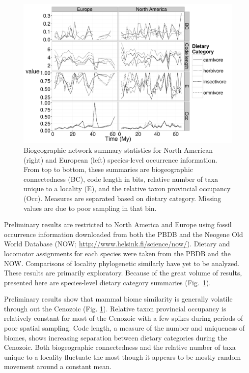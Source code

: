\documentclass[11pt,letterpaper]{article}
\begin{document}
\begin{figure}[ht]
  \centering
  \includegraphics[width = \textwidth, height = 0.4\textheight, keepaspectratio = true]{figure/diets}
  \caption{Biogeographic network summary statistics for North American (right) and European (left) species-level occurrence information. From top to bottom, these summaries are biogeographic connectedness (BC), code length in bits, relative number of taxa unique to a locality (E), and the relative taxon provincial occupancy (Occ). Measures are separated based on dietary category. Missing values are due to poor sampling in that bin.}
  \label{fig:com}
\end{figure}

Preliminary results are restricted to North America and Europe using fossil occurrence information downloaded from both the PBDB and the Neogene Old World Database (NOW; \url{http://www.helsink.fi/science/now/}). Dietary and locomotor assignments for each species were taken from the PBDB and the NOW. Comparisons of locality phylogenetic similarly have yet to be analyzed. These results are primarily exploratory. Because of the great volume of results, presented here are species-level dietary category summaries (Fig.~\ref{fig:com}).

Preliminary results show that mammal biome similarity is generally volatile through out the Cenozoic (Fig. \ref{fig:com}). Relative taxon provincial occupancy is relatively constant for most of the Cenozoic with a few spikes during periods of poor spatial sampling. Code length, a measure of the number and uniqueness of biomes, shows increasing separation between dietary categories during the Cenozoic. Both biogeographic connectedness and the relative number of taxa unique to a locality fluctuate the most though it appears to be mostly random movement around a constant mean.
\end{document}
